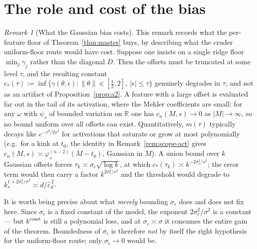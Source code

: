 \documentclass[11pt]{article}
\theoremstyle{remark}
\newtheorem{remark}{Remark}
\newcommand{\R}{\mathbb{R}}
\begin{document}
\section{The role and cost of the bias}\label{sec:bias}

\begin{remark}[What the Gaussian bias costs]\label{rem:bias-cost}
This remark records what the per-feature floor of Theorem~\ref{thm:master} buys, by describing what the cruder uniform-floor route would have cost. Suppose one insists on a single ridge floor $\min_j\gamma_j$ rather than the diagonal $D$. Then the offsets must be truncated at some level $\tau$, and the resulting constant $c_*(\tau) := \inf\{\gamma(\theta,\epsilon) : \lVert\theta\rVert\in[\tfrac12,2],\ |\epsilon|\le\tau\}$ genuinely degrades in $\tau$, and not as an artifact of Proposition~\ref{prop:a2}. A feature with a large offset is evaluated far out in the tail of its activation, where the Mehler coefficients are small: for any $\omega$ with $\psi_s$ of bounded variation on $\R$ one has $c_n(M,s) \to 0$ as $|M| \to \infty$, so no bound uniform over all offsets can exist. Quantitatively, $m(\tau)$ typically decays like $e^{-\tau^2/2s^2}$ for activations that saturate or grow at most polynomially (e.g.\ for a kink at $t_0$, the identity in Remark~\ref{rem:scope-act} gives $c_n(M,s) \asymp \varphi_s^{(n-2)}(M - t_0)$, Gaussian in $M$). A union bound over $k$ Gaussian offsets forces $\tau_k \asymp \sigma_\epsilon\sqrt{\log k}$, at which $c_*(\tau_k) \asymp k^{-2\sigma_\epsilon^2/s^2}$; the error term would then carry a factor $k^{2\sigma_\epsilon^2/s^2}$ and the threshold would degrade to $k_*^{1+2\sigma_\epsilon^2/\sigma^2} \asymp d/\hat\varepsilon_d^{\,2}$.

It is worth being precise about what \emph{merely} bounding $\sigma_\epsilon$ does and does not fix here. Since $\sigma_\epsilon$ is a fixed constant of the model, the exponent $2\sigma_\epsilon^2/\sigma^2$ is a constant --- but $k^{\text{const}}$ is still a polynomial loss, and at $\sigma_\epsilon \asymp \sigma$ it consumes the entire gain of the theorem. Boundedness of $\sigma_\epsilon$ is therefore \emph{not} by itself the right hypothesis for the uniform-floor route; only $\sigma_\epsilon \to 0$ would be.


\end{remark}
\end{document}
